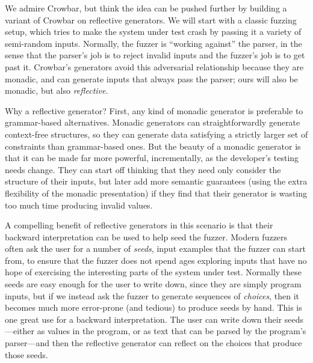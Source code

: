 We admire Crowbar, but think the idea can be pushed further by building
a variant of Crowbar on reflective generators.
We will start with a classic fuzzing setup, which tries to make the
system under test
crash by passing it a variety of semi-random inputs. Normally, the fuzzer is
``working against'' the parser, in the sense that the parser's job is to reject
invalid inputs and the fuzzer's job is to get past it.  Crowbar's generators
avoid this adversarial relationship because they are monadic, and can generate
inputs that always pass the parser; ours will also be monadic, but also {\em
reflective}.

Why a reflective generator? First, any kind of monadic
generator is preferable to grammar-based alternatives. Monadic generators can
straightforwardly generate context-free structures, so they can generate data
satisfying a strictly larger set of constraints than grammar-based ones.
But the beauty of a monadic
generator is that it can be made far more powerful, incrementally, as the
developer's testing needs change. They can start off thinking that they
need only consider the structure of their inputs, but later add more
semantic guarantees (using the extra flexibility of the monadic
presentation) if they find that their generator is wasting too much time
producing invalid values.

A compelling benefit of reflective generators in this scenario is that
their backward interpretation can be used to help seed the fuzzer.
Modern fuzzers often
ask the user for a number of {\em seeds}, input examples that the fuzzer can start from,
to ensure that the fuzzer does not spend ages exploring
inputs that have no hope of exercising the interesting parts of the
system under test. Normally these seeds are easy enough
for the user to write down, since they are simply program inputs, but if
we instead ask the fuzzer to generate sequences of {\em choices}, then
it becomes much more
error-prone (and tedious) to produce seeds by hand.  This is one great use for a
backward interpretation. The user can write down their seeds---either as values
in the program, or as text that can be parsed by the program's parser---and then
the reflective generator can reflect on the choices that produce those seeds.

